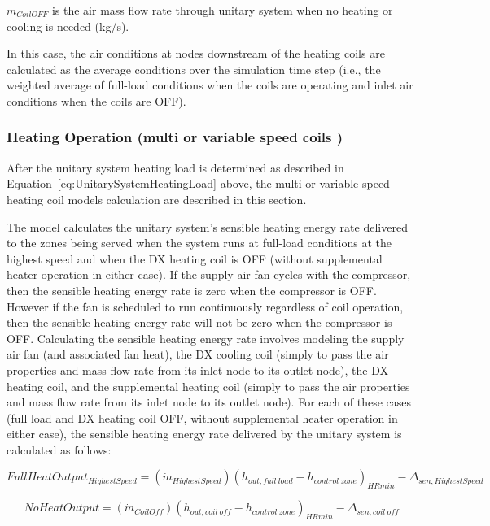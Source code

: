 \(\dot m_{CoilOFF}\) is the air mass flow rate through unitary system when no heating or cooling is needed (kg/s).

In this case, the air conditions at nodes downstream of the heating coils are calculated as the average conditions over the simulation time step (i.e., the weighted average of full-load conditions when the coils are operating and inlet air conditions when the coils are OFF).

\subsubsection{Heating Operation (multi or variable speed coils )}\label{heating-operation-multi-or-variable-speed-coils}

After the unitary system heating load is determined as described in Equation~\ref{eq:UnitarySystemHeatingLoad} above, the multi or variable speed heating coil models calculation are described in this section.

The model calculates the unitary system's sensible heating energy rate delivered to the zones being served when the system runs at full-load conditions at the highest speed and when the DX heating coil is OFF (without supplemental heater operation in either case). If the supply air fan cycles with the compressor, then the sensible heating energy rate is zero when the compressor is OFF. However if the fan is scheduled to run continuously regardless of coil operation, then the sensible heating energy rate will not be zero when the compressor is OFF. Calculating the sensible heating energy rate involves modeling the supply air fan (and associated fan heat), the DX cooling coil (simply to pass the air properties and mass flow rate from its inlet node to its outlet node), the DX heating coil, and the supplemental heating coil (simply to pass the air properties and mass flow rate from its inlet node to its outlet node). For each of these cases (full load and DX heating coil OFF, without supplemental heater operation in either case), the sensible heating energy rate delivered by the unitary system is calculated as follows:

\begin{equation}
FullHeatOutpu{t_{HighestSpeed}} = ({\dot m_{HighestSpeed}}){({h_{out,full~load}} - {h_{control~zone}})_{HRmin}} - {\Delta_{sen,HighestSpeed}}
\end{equation}

\begin{equation}
NoHeatOutput = ({\dot m_{CoilOff}}){({h_{out,coil~off}} - {h_{control~zone}})_{HRmin}} - {\Delta_{sen,coil~off}}
\end{equation}

